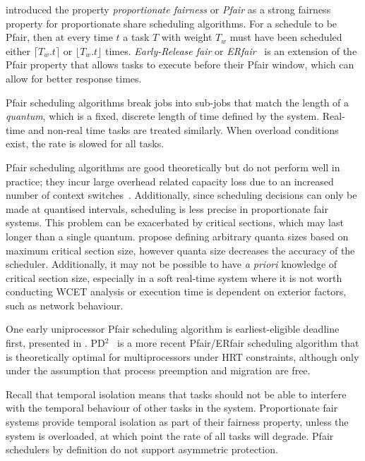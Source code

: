\citet{Baruah_CPV_96} introduced the property \emph{proportionate fairness} or \emph{Pfair} as a
strong fairness property for proportionate share scheduling algorithms.  For a schedule to be Pfair,
then at every time $t$ a task $T$ with weight $T_{w}$ must have been scheduled either $\lceil T_{w}
. t \rceil$ or $\lfloor T_{w}.t \rfloor $ times.  \emph{Early-Release fair} or
\emph{ERfair}~\citep{Anderson_Srinivasan_04} is an extension of the Pfair property that allows tasks to
execute before their Pfair window, which can allow for better response times.

Pfair scheduling algorithms break jobs into sub-jobs that match the length of a \emph{quantum},
which is a fixed, discrete length of time defined by the system.
Real-time and non-real time tasks are treated similarly.
When overload conditions exist, the rate is slowed for all tasks.

Pfair scheduling algorithms are good theoretically but do not perform well in practice; they incur
large overhead related capacity loss due to an increased number of context
switches~\citep{Abeni_Buttazzo_04}. Additionally, since
scheduling decisions can only be made at quantised intervals, scheduling is less precise in
proportionate fair systems.  This problem can be exacerbated by critical sections, which may last
longer than a single quantum.  \citet{Stoica_AKBGP_96} propose defining arbitrary quanta sizes based
on maximum critical section size, however quanta size decreases the accuracy of the scheduler.
Additionally, it may not be possible to have \emph{a priori} knowledge of critical section size, especially
in a soft real-time system where it is not worth conducting \gls{WCET} analysis or execution time
is dependent on exterior factors, such as network behaviour.

One early uniprocessor Pfair scheduling algorithm is earliest-eligible deadline first, presented in
\citet{Stoica_AKBGP_96}.  PD$^{2}$~\citep{Srinivasan_Anderson_06} is a more recent Pfair/ERfair
scheduling algorithm that is theoretically optimal for multiprocessors under \gls{HRT} constraints,
although only under the assumption that process preemption and migration are free.

Recall that temporal isolation means that tasks should not be able to interfere with the temporal
behaviour of other tasks in the system.  Proportionate fair systems provide temporal isolation as
part of their fairness property, unless the system is overloaded, at which point the rate of all
tasks will degrade. Pfair schedulers by definition do not support asymmetric protection.

